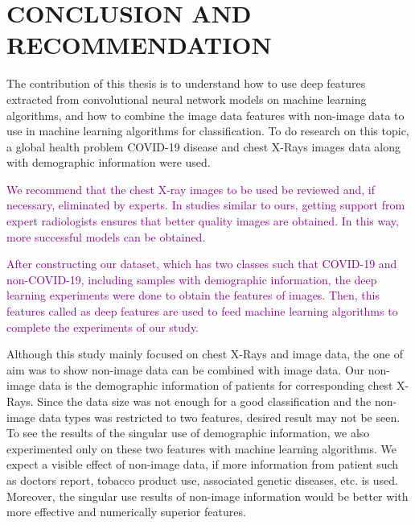 \chapter{CONCLUSION AND RECOMMENDATION}
\label{ch:CH7}

The contribution of this thesis is to understand how to use deep features extracted from convolutional neural network models on machine learning algorithms, and how to combine the image data features with non-image data to use in machine learning algorithms for classification. To do research on this topic, a global health problem COVID-19 disease and chest X-Rays images data along with demographic information were used.

\begin{comment}
The main scope of this thesis was to show an approach on how to use image data without segmenting or manually extracting features to embed them into machine learning algorithms, and afterwards to apply it on a continuing global public health problem.
\end{comment}

\textcolor{purple}{
We recommend that the chest X-ray images to be used be reviewed and, if necessary, eliminated by experts. In studies similar to ours, getting support from expert radiologists ensures that better quality images are obtained. In this way, more successful models can be obtained.}

\textcolor{purple}{After constructing our dataset, which has two classes such that COVID-19 and non-COVID-19, including samples with demographic information, the deep learning experiments were done to obtain the features of images. Then, this features called as deep features are used to feed machine learning algorithms to complete the experiments of our study.}

Although this study mainly focused on chest X-Rays and image data, the one of aim was to show non-image data can be combined with image data. Our non-image data is the demographic information of patients for corresponding chest X-Rays. Since the data size was not enough for a good classification and the non-image data types was restricted to two features, desired result may not be seen. To see the results of the singular use of demographic information, we also experimented only on these two features with machine learning algorithms. We expect a visible effect of non-image data, if more information from patient such as doctors report, tobacco product use, associated genetic diseases, etc. is used. Moreover, the singular use results of non-image information would be better with more effective and numerically superior features.

